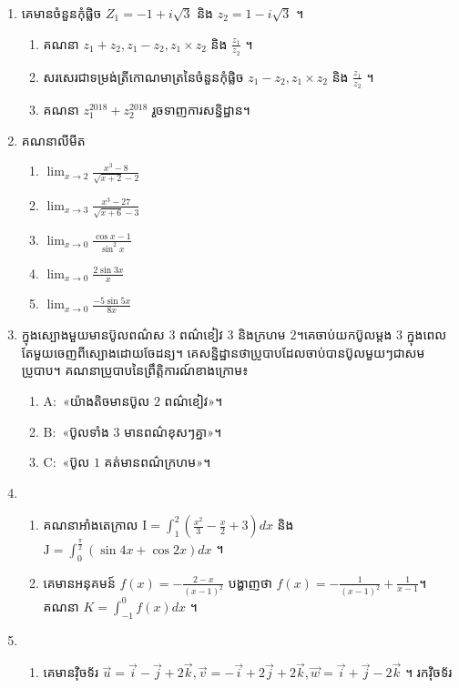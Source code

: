 \documentclass{officialexam}
\begin{document}
	\begin{enumerate}[I]
		\item គេមានចំនួនកុំផ្លិច $Z_1=-1+i\sqrt{3}$ និង $z_2=1-i\sqrt{3}$ ។
		\begin{enumerate}[k]
			\item គណនា $z_1+z_2, z_1-z_2, z_1\times z_2$ និង $\frac{z_1}{z_2}$ ។
			\item សរសេរជាទម្រង់ត្រីកោណមាត្រនៃចំនួនកុំផ្លិច $z_1-z_2, z_1\times z_2$ និង $\frac{z_1}{z_2}$ ។
			\item គណនា $z_1^{2018}+z_2^{2018}$ រួចទាញការសន្និដ្ឋាន។
		\end{enumerate}
		\item គណនាលីមីត 
		\begin{enumerate}[k, 5]
			\item $\lim_{x\to2}\frac{x^3-8}{\sqrt{x+2}-2}$
			\item $\lim_{x\to3}\frac{x^3-27}{\sqrt{x+6}-3}$
			\item $\lim_{x\to0}\frac{\cos x-1}{\sin^2x}$
			\item $\lim_{x\to0}\frac{2\sin3x}{x}$
			\item $\lim_{x\to0}\frac{-5\sin5x}{8x}$
		\end{enumerate}
		\item ក្នុងស្បោងមួយមានប៊ូលពណ៌ស $3$ ពណ៌ខៀវ $3$ និងក្រហម $2$។គេចាប់យកប៊ូលម្ដង $3$ ក្នុងពេលតែមួយចេញពីស្បោងដោយចែដន្យ។ គេសន្និដ្ឋានថាប្រូបាបដែលចាប់បានប៊ូលមួយៗជាសមប្រូបាប។ គណនាប្រូបាបនៃព្រឹត្តិការណ៍ខាងក្រោម៖
		\begin{enumerate}[k]
			\item $\mathrm{A}:$ «យ៉ាងតិចមានប៊ូល $2$ ពណ៌ខៀវ»។
			\item $\mathrm{B}:$ «ប៊ូលទាំង $3$ មានពណ៌ខុសៗគ្នា»។
			\item $\mathrm{C}:$ «ប៊ូល $1$ គត់មានពណ៌ក្រហម»។
		\end{enumerate}
		\item \begin{enumerate}[k]
			\item គណនាអាំងតេក្រាល $\mathrm{I}=\int_{1}^{2}\left(\frac{x^2}{3}-\frac{x}{2}+3\right)dx$ និង $\mathrm{J}=\int_{0}^{\frac{\pi}{2}}\left(\sin4x+\cos2x\right)dx$ ។
			\item គេមានអនុគមន៍ $f(x)=-\frac{2-x}{\left(x-1\right)^2}$ បង្ហាញថា $f(x)=-\frac{1}{\left(x-1\right)^2}+\frac{1}{x-1}$។ គណនា $K=\int_{-1}^{0}f(x)dx$ ។
		\end{enumerate}
		\item \begin{enumerate}[1]
			\item គេមានវ៉ិចទ័រ $\overrightarrow{u}=\vec{i}-\vec{j}+2\vec{k}, \overrightarrow{v}=-\vec{i}+2\vec{j}+2\vec{k}, \overrightarrow{w}=\vec{i}+\vec{j}-2\vec{k}$ ។ រកវ៉ិចទ័រ

\end{enumerate}
\end{enumerate}
\end{document}
